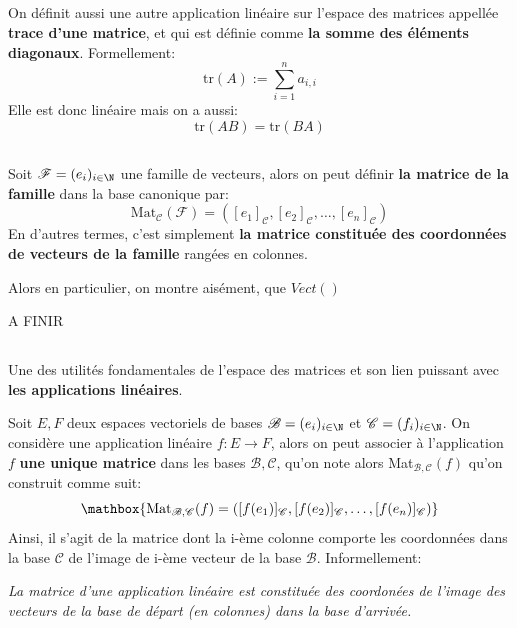 \subsection*{}
On définit aussi une autre application linéaire sur l'espace des matrices appellée \textbf{trace d'une matrice}, et qui est définie comme \textbf{la somme des éléments diagonaux}. Formellement:
\[
   \text{tr}(A) := \sum_{i=1}^{n} a_{i, i}   
\]
Elle est donc linéaire mais on a aussi:
\[
   \text{tr}(AB) = \text{tr}(BA)   
\]

\subsection*{}
Soit \(\mathscr{F} = (e_i)_{i\in\N}\) une famille de vecteurs, alors on peut définir \textbf{la matrice de la famille} dans la base canonique par:
\[
   \text{Mat}_{\mathscr{C}}(\mathscr{F}) = ([e_1]_{\mathscr{C}}, [e_2]_{\mathscr{C}}, \ldots, [e_n]_{\mathscr{C}})  
\]
En d'autres termes, c'est simplement \textbf{la matrice constituée des coordonnées de vecteurs de la famille} rangées en colonnes.\<

Alors en particulier, on montre aisément, que \(Vect()\)

A FINIR

\subsection*{}
Une des utilités fondamentales de l'espace des matrices et son lien puissant avec \textbf{les applications linéaires}.\<

Soit \(E, F\) deux espaces vectoriels de bases \(\mathscr{B} = (e_i)_{i \in \N}\) et \(\mathscr{C}=(f_i)_{i \in \N}\).\+
On considère une application linéaire \(f : E \longrightarrow F\), alors on peut associer à l'application \(f\) \textbf{une unique matrice} dans les bases \(\mathscr{B, C}\), qu'on note alors Mat\(_{\mathscr{B, C}}(f)\) qu'on construit comme suit:
\[
   \mathbox{\text{Mat}_{\mathscr{B, C}}(f) = ([f(e_1)]_{\mathscr{C}}, [f(e_2)]_{\mathscr{C}}, \ldots, [f(e_n)]_{\mathscr{C}})}   
\]
Ainsi, il s'agit de la matrice dont la i-ème colonne comporte les coordonnées dans la base \(\mathscr{C}\) de l'image de i-ème vecteur de la base \(\mathscr{B}\).
Informellement:
\begin{center}
   \textit{
      La matrice d'une application linéaire est constituée des coordonées de l'image des vecteurs de la base de départ (en colonnes) dans la base d'arrivée.
   }
\end{center}

